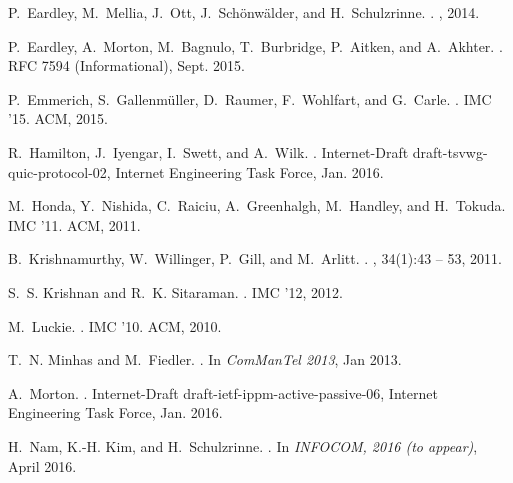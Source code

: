 \documentclass{sigcomm-alternate}
\begin{document}
\begin{thebibliography}{10}
P.~Eardley, M.~Mellia, J.~Ott, J.~Sch{\"o}nw{\"a}lder, and H.~Schulzrinne.
.
, 2014.

P.~Eardley, A.~Morton, M.~Bagnulo, T.~Burbridge, P.~Aitken, and A.~Akhter.
.
\newblock RFC 7594 (Informational), Sept. 2015.

P.~Emmerich, S.~Gallenm\"{u}ller, D.~Raumer, F.~Wohlfart, and G.~Carle.
.
\newblock IMC '15. ACM, 2015.

R.~Hamilton, J.~Iyengar, I.~Swett, and A.~Wilk.
.
\newblock Internet-Draft draft-tsvwg-quic-protocol-02, Internet Engineering
  Task Force, Jan. 2016.

M.~Honda, Y.~Nishida, C.~Raiciu, A.~Greenhalgh, M.~Handley, and H.~Tokuda.
\newblock IMC '11. ACM, 2011.

B.~Krishnamurthy, W.~Willinger, P.~Gill, and M.~Arlitt.
.
, 34(1):43 -- 53, 2011.

S.~S. Krishnan and R.~K. Sitaraman.
.
\newblock IMC '12, 2012.

\vfill\eject

M.~Luckie.
.
\newblock IMC '10. ACM, 2010.

T.~N. Minhas and M.~Fiedler.
.
\newblock In {\em ComManTel 2013}, Jan 2013.

A.~Morton.
.
\newblock Internet-Draft draft-ietf-ippm-active-passive-06, Internet
  Engineering Task Force, Jan. 2016.

H.~Nam, K.-H. Kim, and H.~Schulzrinne.
.
\newblock In {\em INFOCOM, 2016 (to appear)}, April 2016.


\end{thebibliography}
\end{document}
